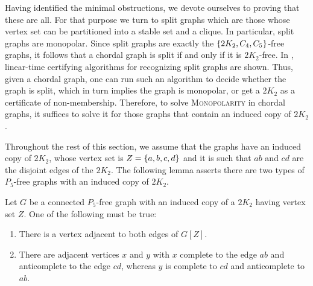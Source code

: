 Having identified the minimal obstructions, we devote ourselves to proving that
these are all. For that purpose we turn to split graphs which are those whose
vertex set can be partitioned into a stable set and a clique. In particular,
split graphs are monopolar. Since split graphs are exactly the $\left\{2K_2, C_4,
C_5\right\}$-free graphs, it follows that a chordal graph is split if and only if it is
$2K_2$-free. In \cite{heggernesNJC14,hellDAM141}, linear-time certifying
algorithms for recognizing split graphs are shown. Thus, given a chordal graph,
one can run such an algorithm to decide whether the graph is split, which in
turn implies the graph is monopolar, or get a $2K_2$ as a certificate of
non-membership. Therefore, to solve \textsc{Monopolarity} in chordal graphs, it
suffices to solve it for those graphs that contain an induced copy of $2K_2$. 

Throughout the rest of this section, we assume that the graphs have an induced
copy of $2K_2$, whose vertex set is $Z=\left\{a,b,c,d\right\}$ and it is such that $ab$ and
$cd$ are the disjoint edges of the $2K_2$. The following lemma asserts there are
two types of $P_5$-free graphs with an induced copy of $2K_2$.

\begin{lemma}
    \label{lem:chordal_connectedness}
    Let $G$ be a connected $P_5$-free graph with an induced copy of a $2K_2$
    having vertex set $Z$. One of the following must be true:
    \begin{enumerate}[label=(\roman*)]
        \item There is a vertex adjacent to both edges of $G[Z]$.
        \item There are adjacent vertices $x$ and $y$ with $x$ complete to the
        edge $ab$ and anticomplete to the edge $cd$, whereas $y$ is complete to
        $cd$ and anticomplete to $ab$.
    \end{enumerate}
\end{lemma}

